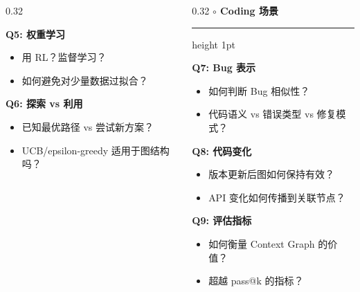 \documentclass[aspectratio=169,10pt]{beamer}
\renewcommand{\footnotesize}{\tiny}
\begin{document}
\begin{frame}
\begin{columns}[t]
\begin{column}{0.32\textwidth}
      \vspace{0.15cm}

      \textbf{Q5: 权重学习}
      \begin{itemize}
        \item 用 RL？监督学习？
        \item 如何避免对少量数据过拟合？
      \end{itemize}

      \vspace{0.15cm}

      \textbf{Q6: 探索 vs 利用}
      \begin{itemize}
        \item 已知最优路径 vs 尝试新方案？
        \item UCB/epsilon-greedy 适用于图结构吗？
      \end{itemize}
    \end{column}

    \begin{column}{0.32\textwidth}
      \textbf{\large $\circ$ Coding 场景}
      \vspace{0.1cm}
      \hrule height 1pt
      \vspace{0.2cm}

      \textbf{Q7: Bug 表示}
      \begin{itemize}
        \item 如何判断 Bug 相似性？
        \item 代码语义 vs 错误类型 vs 修复模式？
      \end{itemize}

      \vspace{0.15cm}

      \textbf{Q8: 代码变化}
      \begin{itemize}
        \item 版本更新后图如何保持有效？
        \item API 变化如何传播到关联节点？
      \end{itemize}

      \vspace{0.15cm}

      \textbf{Q9: 评估指标}
      \begin{itemize}
        \item 如何衡量 Context Graph 的价值？
        \item 超越 pass@k 的指标？
      \end{itemize}
    \end{column}
  \end{columns}
\end{frame}
\end{document}
